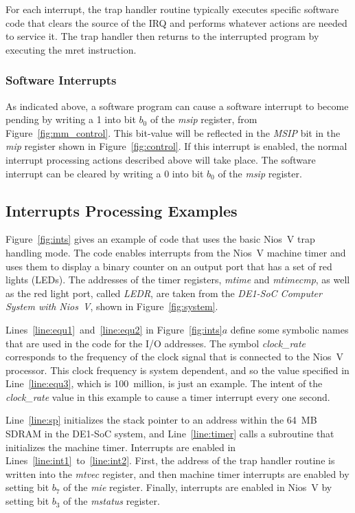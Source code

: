\documentclass[11pt, twoside, pdftex]{article}
\begin{document}
For each interrupt, the trap handler routine typically executes specific software code that
clears the source of the IRQ and performs whatever actions are needed to service it. The trap 
handler then returns to the interrupted program by executing the {\sf mret} instruction. 

\subsubsection{Software Interrupts}
\label{sec:swi}

As indicated above, a software program can cause a software interrupt to become pending by
writing a 1 into bit $b_0$ of the {\it msip} register, from Figure~\ref{fig:mm_control}.
This bit-value will be reflected in the {\it MSIP} bit in the {\it mip} register shown 
in Figure~\ref{fig:control}. If this interrupt is enabled, the normal interrupt processing 
actions described above will take place. The software interrupt can be cleared by writing a 0 
into bit $b_0$ of the {\it msip} register.

\subsection{Interrupts Processing Examples}
\label{sec:modes}

Figure~\ref{fig:ints} gives an example of code that uses the basic Nios~V trap handling mode.
The code enables interrupts from the Nios~V machine timer and uses them to display a 
binary counter on an output port that has a set of red lights (LEDs). The addresses of the timer
registers, {\it mtime} and {\it mtimecmp}, as well as the red light port, called {\it LEDR},
are taken from the {\it DE1-SoC Computer System with Nios~V}, shown in
Figure~\ref{fig:system}. 

Lines~\ref{line:equ1}~and~\ref{line:equ2} in Figure~\ref{fig:ints}$a$ define some symbolic 
names that are used in the code for the I/O addresses. The symbol {\it clock\_rate}
corresponds to the frequency of the clock signal that is connected to the Nios~V
processor. This clock frequency is system dependent, and so the value specified in 
Line~\ref{line:equ3}, which is 100~million, is just an example. The intent of the 
{\it clock\_rate} value in this example to cause a timer interrupt every one second.

Line~\ref{line:sp} initializes the stack pointer to an address within the 64~MB SDRAM 
in the DE1-SoC system, and Line~\ref{line:timer} calls a subroutine that initializes the
machine timer. 
Interrupts are enabled in Lines~\ref{line:int1}~to~\ref{line:int2}. First, the address of
the trap handler routine is written into the {\it mtvec} register, and then machine timer 
interrupts are enabled by setting bit $b_7$ of the {\it mie} register. Finally, interrupts 
are enabled in Nios~V by setting bit $b_3$ of the {\it mstatus} register.
\end{document}
